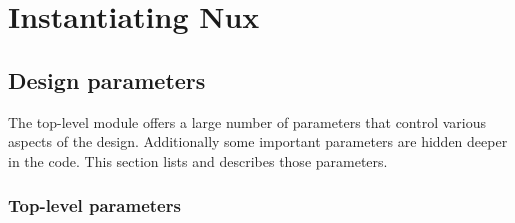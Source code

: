 \chapter{Instantiating Nux}


\section{Design parameters}
The top-level module  offers a large number of parameters that control various aspects of the design.
Additionally some important parameters are hidden deeper in the code.
This section lists and describes those parameters.

\subsection{Top-level parameters}
\label{sec:topopt}

